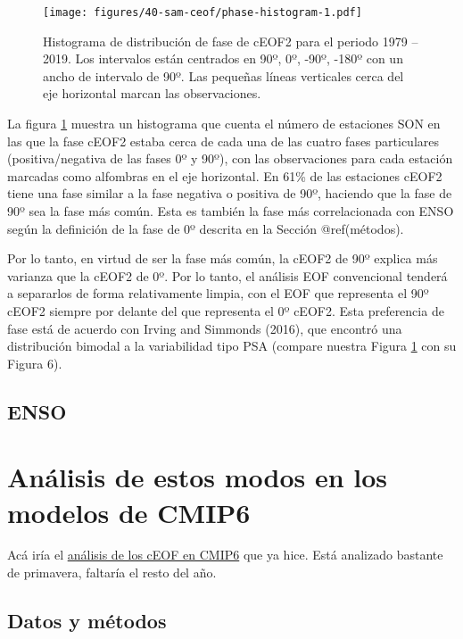 \documentclass[12pt,oneside]{reedthesis}
\begin{document}
\begin{figure}
\centering
\texttt{[image: figures/40-sam-ceof/phase-histogram-1.pdf]}
\caption{\label{fig:phase-histogram}Histograma de distribución de fase de cEOF2 para el periodo 1979 -- 2019. Los intervalos están centrados en 90º, 0º, -90º, -180º con un ancho de intervalo de 90º. Las pequeñas líneas verticales cerca del eje horizontal marcan las observaciones.}
\end{figure}
La figura \ref{fig:phase-histogram} muestra un histograma que cuenta el número de estaciones SON en las que la fase cEOF2 estaba cerca de cada una de las cuatro fases particulares (positiva/negativa de las fases 0º y 90º), con las observaciones para cada estación marcadas como alfombras en el eje horizontal.
En 61\% de las estaciones cEOF2 tiene una fase similar a la fase negativa o positiva de 90º, haciendo que la fase de 90º sea la fase más común.
Esta es también la fase más correlacionada con ENSO según la definición de la fase de 0º descrita en la Sección @ref(métodos).

Por lo tanto, en virtud de ser la fase más común, la cEOF2 de 90º explica más varianza que la cEOF2 de 0º.
Por lo tanto, el análisis EOF convencional tenderá a separarlos de forma relativamente limpia, con el EOF que representa el 90º cEOF2 siempre por delante del que representa el 0º cEOF2.
Esta preferencia de fase está de acuerdo con Irving and Simmonds (2016), que encontró una distribución bimodal a la variabilidad tipo PSA (compare nuestra Figura \ref{fig:phase-histogram} con su Figura 6).

\hypertarget{enso}{%
\section{ENSO}\label{enso}}

\hypertarget{anuxe1lisis-de-estos-modos-en-los-modelos-de-cmip6}{%
\chapter{Análisis de estos modos en los modelos de CMIP6}\label{anuxe1lisis-de-estos-modos-en-los-modelos-de-cmip6}}

Acá iría el \href{https://htmlpreview.github.io/?https://github.com/eliocamp/onda3/blob/master/35-cEOF-CMIP6-superensemble-SON.html}{análisis de los cEOF en CMIP6} que ya hice. Está analizado bastante de primavera, faltaría el resto del año.

\hypertarget{datos-y-muxe9todos-3}{%
\section{Datos y métodos}\label{datos-y-muxe9todos-3}}
\end{document}
